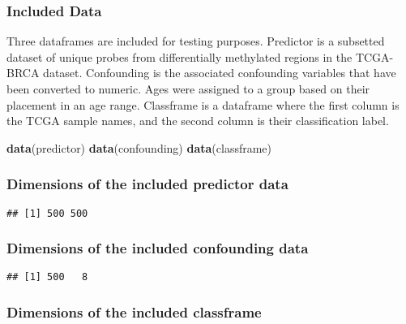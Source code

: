\documentclass[
]{article}
\newenvironment{Shaded}{\begin{snugshade}}{\end{snugshade}}
\newcommand{\KeywordTok}[1]{\textcolor[rgb]{0.13,0.29,0.53}{\textbf{#1}}}
\newcommand{\NormalTok}[1]{#1}
\begin{document}
\hypertarget{included-data}{%
\subsubsection{Included Data}\label{included-data}}

Three dataframes are included for testing purposes. Predictor is a
subsetted dataset of unique probes from differentially methylated
regions in the TCGA-BRCA dataset. Confounding is the associated
confounding variables that have been converted to numeric. Ages were
assigned to a group based on their placement in an age range. Classframe
is a dataframe where the first column is the TCGA sample names, and the
second column is their classification label.

\begin{Shaded}
\begin{Highlighting}[]
\KeywordTok{data}\NormalTok{(predictor)}
\KeywordTok{data}\NormalTok{(confounding)}
\KeywordTok{data}\NormalTok{(classframe)}
\end{Highlighting}
\end{Shaded}

\hypertarget{dimensions-of-the-included-predictor-data}{%
\subsubsection{Dimensions of the included predictor
data}\label{dimensions-of-the-included-predictor-data}}

\begin{verbatim}
## [1] 500 500
\end{verbatim}

\hypertarget{dimensions-of-the-included-confounding-data}{%
\subsubsection{Dimensions of the included confounding
data}\label{dimensions-of-the-included-confounding-data}}

\begin{verbatim}
## [1] 500   8
\end{verbatim}

\hypertarget{dimensions-of-the-included-classframe}{%
\subsubsection{Dimensions of the included
classframe}\label{dimensions-of-the-included-classframe}}
\end{document}
